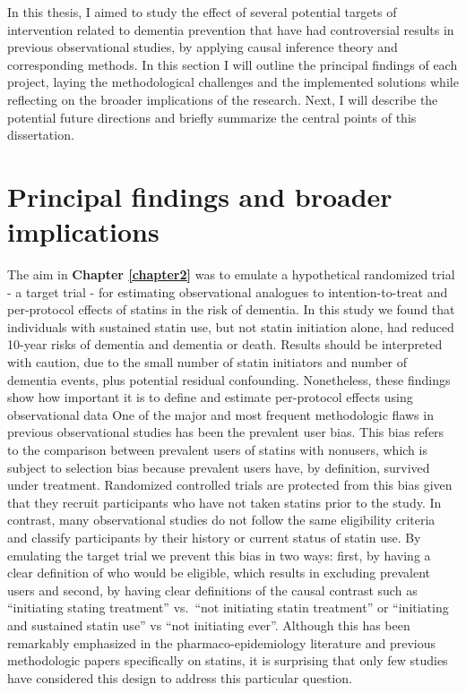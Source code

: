 \documentclass[
]{book}
\begin{document}

\newpage

In this thesis, I aimed to study the effect of several potential targets of intervention related to dementia prevention that have had controversial results in previous observational studies, by applying causal inference theory and corresponding methods. In this section I will outline the principal findings of each project, laying the methodological challenges and the implemented solutions while reflecting on the broader implications of the research. Next, I will describe the potential future directions and briefly summarize the central points of this dissertation.

\hypertarget{principal-findings-and-broader-implications}{%
\section{Principal findings and broader implications}\label{principal-findings-and-broader-implications}}

The aim in \textbf{Chapter \ref{chapter2}} was to emulate a hypothetical randomized trial - a target trial - for estimating observational analogues to intention-to-treat and per-protocol effects of statins in the risk of dementia. In this study we found that individuals with sustained statin use, but not statin initiation alone, had reduced 10-year risks of dementia and dementia or death. Results should be interpreted with caution, due to the small number of statin initiators and number of dementia events, plus potential residual confounding. Nonetheless, these findings show how important it is to define and estimate per-protocol effects using observational data
One of the major and most frequent methodologic flaws in previous observational studies has been the prevalent user bias\autocite{luijken2021,power2015}. This bias refers to the comparison between prevalent users of statins with nonusers, which is subject to selection bias because prevalent users have, by definition, survived under treatment\autocite{hernan2008,danaei2012}. Randomized controlled trials are protected from this bias given that they recruit participants who have not taken statins prior to the study. In contrast, many observational studies do not follow the same eligibility criteria and classify participants by their history or current status of statin use. By emulating the target trial we prevent this bias in two ways\autocite{hernan2016,hernan_robins_2016}: first, by having a clear definition of who would be eligible, which results in excluding prevalent users and second, by having clear definitions of the causal contrast such as ``initiating stating treatment'' vs.~``not initiating statin treatment'' or ``initiating and sustained statin use'' vs ``not initiating ever''. Although this has been remarkably emphasized in the pharmaco-epidemiology literature\autocite{ray2003,lund2015,johnson2013} and previous methodologic papers specifically on statins\autocite{danaei2012,power2015,emilsson2018}, it is surprising that only few studies have considered this design to address this particular question.
\end{document}
